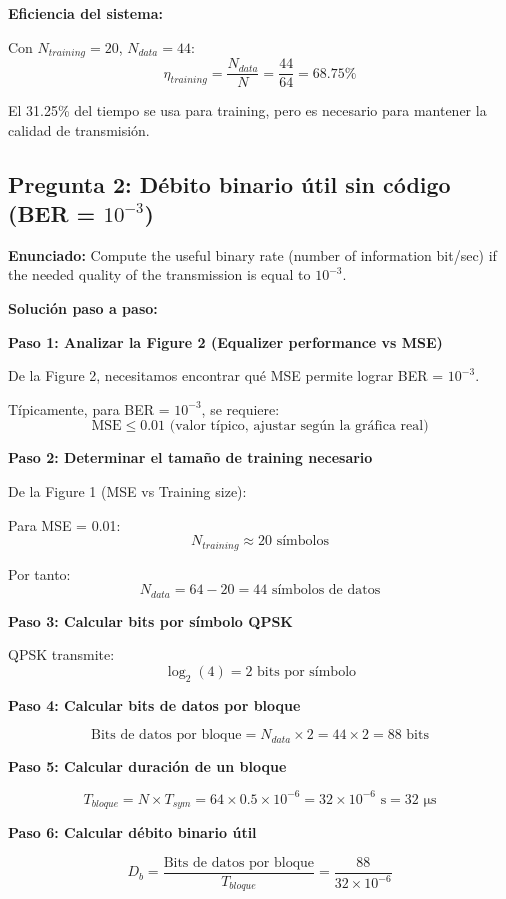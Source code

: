 \documentclass[11pt,a4paper]{article}
\begin{document}
\textbf{Eficiencia del sistema:}

Con $N_{training} = 20$, $N_{data} = 44$:
\[
\eta_{training} = \frac{N_{data}}{N} = \frac{44}{64} = 68.75\%
\]

El 31.25\% del tiempo se usa para training, pero es necesario para mantener la calidad de transmisi\'on.



\subsection*{Pregunta 2: D\'ebito binario \'util sin c\'odigo (BER = $10^{-3}$)}

\textbf{Enunciado:} Compute the useful binary rate (number of information bit/sec) if the needed quality of the transmission is equal to $10^{-3}$.

\vspace{0.3cm}
\textbf{Soluci\'on paso a paso:}

\textbf{Paso 1: Analizar la Figure 2 (Equalizer performance vs MSE)}

De la Figure 2, necesitamos encontrar qu\'e MSE permite lograr BER = $10^{-3}$.

T\'ipicamente, para BER = $10^{-3}$, se requiere:
\[
\text{MSE} \leq 0.01 \text{ (valor t\'ipico, ajustar seg\'un la gr\'afica real)}
\]

\textbf{Paso 2: Determinar el tama\~no de training necesario}

De la Figure 1 (MSE vs Training size):

Para MSE = 0.01:
\[
N_{training} \approx 20 \text{ s\'imbolos}
\]

Por tanto:
\[
N_{data} = 64 - 20 = 44 \text{ s\'imbolos de datos}
\]

\textbf{Paso 3: Calcular bits por s\'imbolo QPSK}

QPSK transmite:
\[
\log_2(4) = 2 \text{ bits por s\'imbolo}
\]

\textbf{Paso 4: Calcular bits de datos por bloque}

\[
\text{Bits de datos por bloque} = N_{data} \times 2 = 44 \times 2 = 88 \text{ bits}
\]

\textbf{Paso 5: Calcular duraci\'on de un bloque}

\[
T_{bloque} = N \times T_{sym} = 64 \times 0.5 \times 10^{-6} = 32 \times 10^{-6} \text{ s} = 32 \text{ μs}
\]

\textbf{Paso 6: Calcular d\'ebito binario \'util}

\[
D_b = \frac{\text{Bits de datos por bloque}}{T_{bloque}} = \frac{88}{32 \times 10^{-6}}
\]
\end{document}
